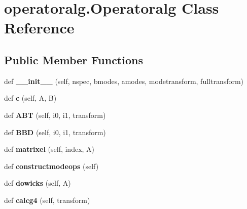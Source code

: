\hypertarget{classoperatoralg_1_1Operatoralg}{}\section{operatoralg.\+Operatoralg Class Reference}
\label{classoperatoralg_1_1Operatoralg}
\subsection*{Public Member Functions}
\begin{DoxyCompactItemize}
\item 
\mbox{\label{classoperatoralg_1_1Operatoralg_acfa8a642655e4f8783abbc0dcd2b1eb5}} 
def {\bfseries \+\_\+\+\_\+init\+\_\+\+\_\+} (self, nspec, bmodes, amodes, modetransform, fulltransform)
\item 
\mbox{\label{classoperatoralg_1_1Operatoralg_ae839176ac841c512cf853871453f83e5}} 
def {\bfseries c} (self, A, B)
\item 
\mbox{\label{classoperatoralg_1_1Operatoralg_a7f0626eb6cea07815477f48b5e87da14}} 
def {\bfseries A\+BT} (self, i0, i1, transform)
\item 
\mbox{\label{classoperatoralg_1_1Operatoralg_a58c421076c3b35f06b4d219b0e873cb8}} 
def {\bfseries B\+BD} (self, i0, i1, transform)
\item 
\mbox{\label{classoperatoralg_1_1Operatoralg_ac6bf85a9e62db9a785eb8dbda3e79ac5}} 
def {\bfseries matrixel} (self, index, A)
\item 
\mbox{\label{classoperatoralg_1_1Operatoralg_a16e0175011dd63ce46e6ca89b70b09e9}} 
def {\bfseries constructmodeops} (self)
\item 
\mbox{\label{classoperatoralg_1_1Operatoralg_a02d29c2adcfa16a295a84a4bb1c73860}} 
def {\bfseries dowicks} (self, A)
\item 
\mbox{\label{classoperatoralg_1_1Operatoralg_ac0bff7121b77b648d469e52636a60bed}} 
def {\bfseries calcg4} (self, transform)
\end{DoxyCompactItemize}
